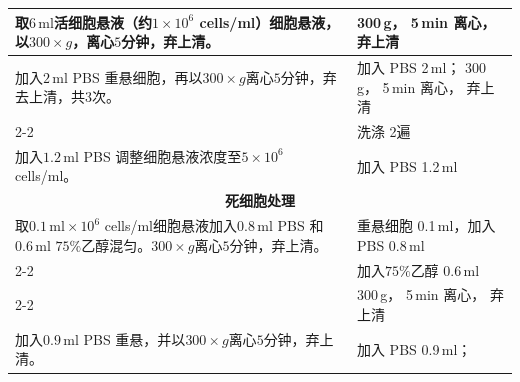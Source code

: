 \documentclass[UTF8,10pt,a4paper,fontset=fandol]{ctexart}
\newcommand{\fieldvalue}[1]{#1}
\newcommand{\handwritten}[1]{#1}
\begin{document}
\begin{tabularx}{\textwidth}{|X|X|}
\hline
取$6\,\mathrm{ml}$活细胞悬液（约$1\times10^{6}$ cells/ml）细胞悬液，以$300\times g$，离心$5$分钟，弃上清。 &
\fieldvalue{\handwritten{300}}\,g，%
\fieldvalue{\handwritten{5}}\,min 离心，%
\fieldvalue{\handwritten{\checkmark}}弃上清
\\ \hline
加入$2\,\mathrm{ml}$ PBS 重悬细胞，再以$300\times g$离心$5$分钟，弃去上清，共$3$次。 &
加入 PBS %
\fieldvalue{\handwritten{2}}\,ml；%
\fieldvalue{\handwritten{300}}\,g，%
\fieldvalue{\handwritten{5}}\,min 离心，%
\fieldvalue{\handwritten{\checkmark}}弃上清
\\ \cline{2-2}
&
洗涤 %
\fieldvalue{\handwritten{2}}遍
\\ \hline
加入$1.2\,\mathrm{ml}$ PBS 调整细胞悬液浓度至$5\times10^{6}$ cells/ml。 &
加入 PBS %
\fieldvalue{\handwritten{1.2}}\,ml
\\ \hline
\multicolumn{2}{|c|}{\textbf{死细胞处理}}\\ \hline
取$0.1\,\mathrm{ml}\times10^{6}$ cells/ml细胞悬液加入$0.8\,\mathrm{ml}$ PBS 和$0.6\,\mathrm{ml}$ $75\%$乙醇混匀。$300\times g$离心$5$分钟，弃上清。 &
重悬细胞 %
\fieldvalue{\handwritten{0.1}}\,ml，加入 PBS %
\fieldvalue{\handwritten{0.8}}\,ml
\\ \cline{2-2}
&
加入$75\%$乙醇 %
\fieldvalue{\handwritten{0.6}}\,ml
\\ \cline{2-2}
&
%
\fieldvalue{\handwritten{300}}\,g，%
\fieldvalue{\handwritten{5}}\,min 离心，%
\fieldvalue{\handwritten{\checkmark}}弃上清
\\ \hline
加入$0.9\,\mathrm{ml}$ PBS 重悬，并以$300\times g$离心$5$分钟，弃上清。 &
加入 PBS %
\fieldvalue{\handwritten{0.9}}\,ml；%

\end{tabularx}
\end{document}
